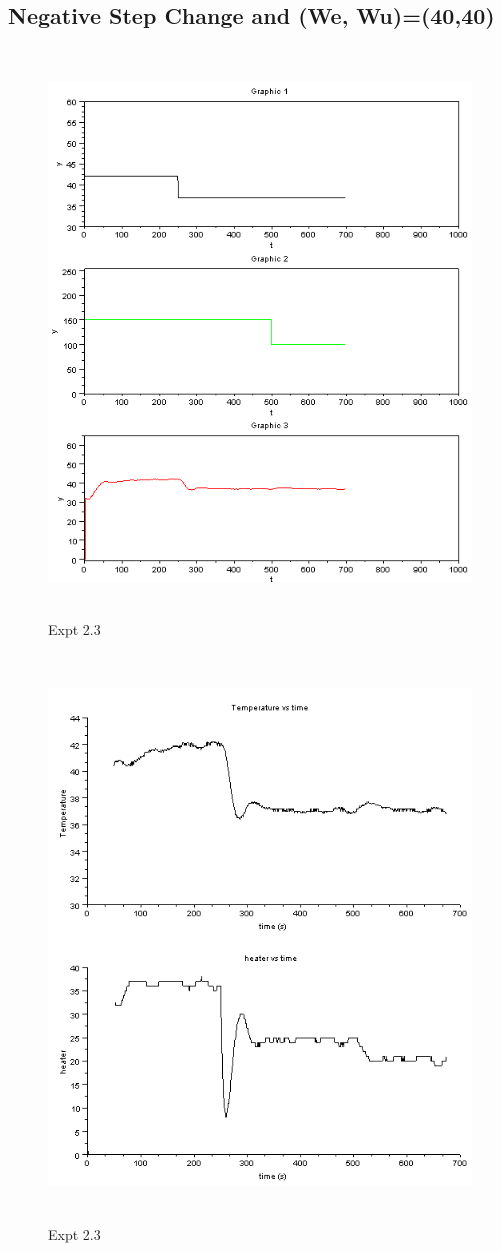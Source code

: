 \subsection{Negative Step Change and (We, Wu)=(40,40)}
\begin{figure}[H]
 \includegraphics[width=12cm, height=15cm]{mpc/2_3.PNG}
  \caption{Expt 2.3}
\end{figure}
\begin{figure}[H]
  \includegraphics[width=12cm, height=15cm]{mpc/2_3_heater_final.png}
  \caption{ Expt 2.3}
\end{figure}



